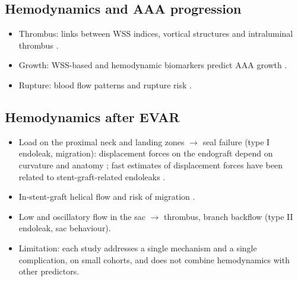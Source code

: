 \subsection{Hemodynamics and AAA progression}
\begin{itemize}
    \item Thrombus: links between WSS indices, vortical structures and intraluminal thrombus \cite{zambrano_association_2022, belkacemi_intraluminal_2023}.
    \item Growth: WSS-based and hemodynamic biomarkers predict AAA growth \cite{meyrignac_combining_2020, forneris_ai-powered_2023, kim_deep_2023, rezaeitaleshmahalleh_characterization_2023, joly_cohort_2020, fedotova_association_2025}.
    \item Rupture: blood flow patterns and rupture risk \cite{qiu_association_2022}.
\end{itemize}

\subsection{Hemodynamics after EVAR}
\label{sec:hemo-evar}
\begin{itemize}
    \item Load on the proximal neck and landing zones $\rightarrow$ seal failure (type I endoleak, migration): displacement forces on the endograft depend on curvature and anatomy \cite{figueroa_effect_2009, kandail_patient-specific_2014}; fast estimates of displacement forces have been related to stent-graft-related endoleaks \cite{weng_role_2025}.
    \item In-stent-graft helical flow and risk of migration \cite{tasso_-stent_2019}.
    \item Low and oscillatory flow in the sac $\rightarrow$ thrombus, branch backflow (type II endoleak, sac behaviour). \citeneeded{}
    \item Limitation: each study addresses a single mechanism and a single complication, on small cohorts, and does not combine hemodynamics with other predictors.
\end{itemize}

